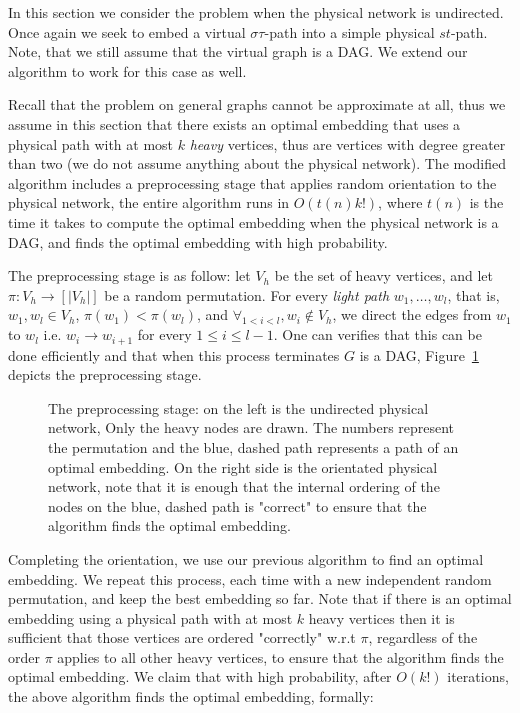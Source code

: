 In this section we consider the problem when the physical network is undirected.
Once again we seek to embed a virtual $\sigma\tau$-path 
into a simple physical $st$-path.
Note, that we still assume that the virtual graph is a DAG. 
We extend our algorithm to work for this case as well.

Recall that the problem on general graphs cannot be approximate at all,
thus we assume in this section that there exists an optimal embedding that uses
a physical path with at most $k$ \emph{heavy} vertices, thus are vertices with
degree greater than two (we do not assume anything about the physical network).
The modified algorithm includes a preprocessing stage that applies
random orientation to the physical network, the entire algorithm runs in
$O(t(n)k!)$, where $t(n)$ is the time it takes to compute the optimal embedding when the
physical network is a DAG, and finds the optimal embedding with high
probability.

The preprocessing stage is as follow:
let $V_h$ be the set of heavy vertices, and let 
$\pi:V_h \to [|V_h|]$ be a random permutation.
For every \emph{light path} $w_1, \ldots, w_l$, that is, $w_1, w_l \in
V_h$, $\pi(w_1) < \pi(w_l)$, and $\forall_{1 < i < l}, w_i \notin V_h$,
we direct the edges from $w_1$ to $w_l$ i.e. $w_i \to w_{i+1}$ for every $1
\leq i \leq l - 1$.
One can verifies that this can be done efficiently and that when this process
terminates $G$ is a DAG, Figure~\ref{fig:orientation} depicts the preprocessing
stage.

\begin{figure}[ht]

\caption{
\label{fig:orientation}
The preprocessing stage: on the left is the undirected physical network,
Only the heavy nodes are drawn.
The numbers represent the permutation and the blue, dashed path represents a
path of an optimal embedding.
On the right side is the orientated physical network, 
note that it is enough that the internal ordering of the nodes on the blue,
dashed path is "correct" to ensure that the algorithm finds the optimal
embedding. }
\end{figure}

Completing the orientation, we use our previous algorithm to find an optimal
embedding.
We repeat this process, each time with a new independent random permutation, and
keep the best embedding so far.
Note that if there is an optimal embedding using a physical path with at most
$k$ heavy vertices then it is sufficient that those vertices are ordered
"correctly" w.r.t $\pi$, regardless of the order $\pi$ applies to all other
heavy vertices, to ensure that the algorithm finds the optimal embedding.
We claim that with high probability, 
after $O(k!)$ iterations, the above algorithm finds the optimal embedding, formally:

